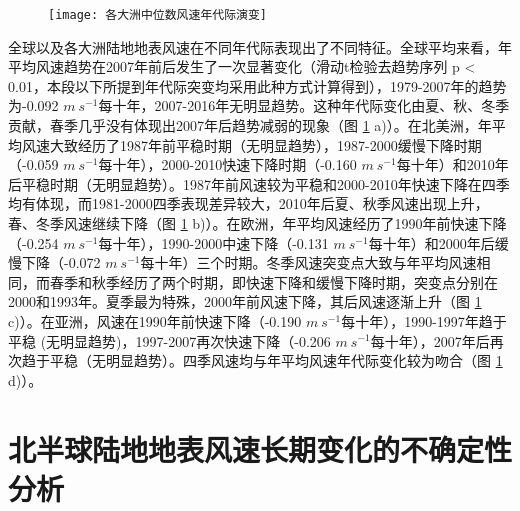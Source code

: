 \begin{figure}[!b]
    \centering
    \texttt{[image: 各大洲中位数风速年代际演变]}
    \label{fig:regionalmedianwinddecadalchange}
\end{figure}

全球以及各大洲陆地地表风速在不同年代际表现出了不同特征。全球平均来看，年平均风速趋势在2007年前后发生了一次显著变化（滑动t检验去趋势序列 p < 0.01，本段以下所提到年代际突变均采用此种方式计算得到），1979-2007年的趋势为-0.092 $m ~ s^{-1}$每十年，2007-2016年无明显趋势。这种年代际变化由夏、秋、冬季贡献，春季几乎没有体现出2007年后趋势减弱的现象（图 \ref{fig:regionalmedianwinddecadalchange} a)）。在北美洲，年平均风速大致经历了1987年前平稳时期（无明显趋势），1987-2000缓慢下降时期（-0.059 $m ~ s^{-1}$每十年），2000-2010快速下降时期（-0.160 $m ~ s^{-1}$每十年）和2010年后平稳时期（无明显趋势）。1987年前风速较为平稳和2000-2010年快速下降在四季均有体现，而1981-2000四季表现差异较大，2010年后夏、秋季风速出现上升，春、冬季风速继续下降（图 \ref{fig:regionalmedianwinddecadalchange} b)）。在欧洲，年平均风速经历了1990年前快速下降（-0.254 $m ~ s^{-1}$每十年），1990-2000中速下降（-0.131 $m ~ s^{-1}$每十年）和2000年后缓慢下降（-0.072 $m ~ s^{-1}$每十年）三个时期。冬季风速突变点大致与年平均风速相同，而春季和秋季经历了两个时期，即快速下降和缓慢下降时期，突变点分别在2000和1993年。夏季最为特殊，2000年前风速下降，其后风速逐渐上升（图 \ref{fig:regionalmedianwinddecadalchange} c)）。在亚洲，风速在1990年前快速下降（-0.190 $m ~ s^{-1}$每十年），1990-1997年趋于平稳 (无明显趋势)，1997-2007再次快速下降（-0.206 $m ~ s^{-1}$每十年），2007年后再次趋于平稳（无明显趋势）。四季风速均与年平均风速年代际变化较为吻合（图 \ref{fig:regionalmedianwinddecadalchange} d)）。

\section{北半球陆地地表风速长期变化的不确定性分析}


